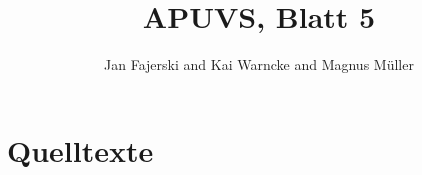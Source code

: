 \documentclass[a4paper,
12pt,
BCOR12mm,
]{scrartcl}
\title{APUVS, Blatt 5}
\author{Jan Fajerski and Kai Warncke and Magnus Müller}
\begin{document}

\maketitle 

\section{Quelltexte}



\end{document}
